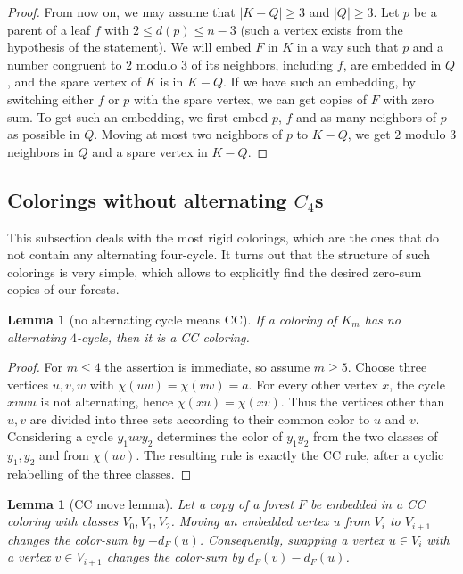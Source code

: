 \documentclass[11pt]{article}
\newtheorem{lemma}[theorem]{Lemma}
\begin{document}
\begin{proof}
    From now on, we may assume that $|K-Q| \geq 3$ and $|Q| \geq 3$. Let $p$ be a parent of a leaf $f$ with $2 \leq d(p) \leq n-3$ (such a vertex exists from the hypothesis of the statement). We will embed $F$ in $K$ in a way such that $p$ and a number congruent to $2$ modulo $3$ of its neighbors, including $f$, are embedded in $Q$, and the spare vertex of $K$ is in $K-Q$. If we have such an embedding, by switching either $f$ or $p$ with the spare vertex, we can get copies of $F$ with zero sum. To get such an embedding, we first embed $p$, $f$ and as many neighbors of $p$ as possible in $Q$. Moving at most two neighbors of $p$ to $K-Q$, we get $2$ modulo $3$ neighbors in $Q$ and a spare vertex in $K-Q$.
    
\end{proof}



\subsection{Colorings without alternating $C_4$s}\label{sec:lemmas}

This subsection deals with the most rigid colorings, which are the ones that do not contain any alternating four-cycle. It turns out that the structure of such colorings is very simple, which allows to explicitly find the desired zero-sum copies of our forests.

\begin{lemma}[no alternating cycle means CC]\label{lem:no-alt-cc}
If a coloring of $K_m$ has no alternating $4$-cycle, then it is a CC coloring.
\end{lemma}

\begin{proof}
For $m\le4$ the assertion is immediate, so assume $m\ge5$.  Choose three vertices $u,v,w$ with $\chi(uw)=\chi(vw)=a$.  For every other vertex $x$, the cycle $xvwu$ is not alternating, hence $\chi(xu)=\chi(xv)$.  Thus the vertices other than $u,v$ are divided into three sets according to their common color to $u$ and $v$.  Considering a cycle $y_1uvy_2$ determines the color of $y_1y_2$ from the two classes of $y_1,y_2$ and from $\chi(uv)$.  The resulting rule is exactly the CC rule, after a cyclic relabelling of the three classes.
\end{proof}

\begin{lemma}[CC move lemma]\label{lem:cc-move}
Let a copy of a forest $F$ be embedded in a CC coloring with classes $V_0,V_1,V_2$.  Moving an embedded vertex $u$ from $V_i$ to $V_{i+1}$ changes the color-sum by $-d_F(u)$.  Consequently, swapping a vertex $u\in V_i$ with a vertex $v\in V_{i+1}$ changes the color-sum by $d_F(v)-d_F(u)$.
\end{lemma}
\end{document}
